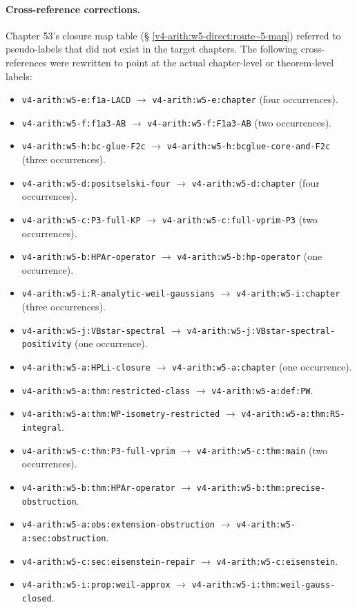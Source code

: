 \paragraph{Cross-reference corrections.}
Chapter 53's closure map table (\S
\ref{v4-arith:w5-direct:route~5-map}) referred to pseudo-labels that
did not exist in the target chapters. The following cross-references
were rewritten to point at the actual chapter-level or theorem-level
labels:
\begin{itemize}
\item \texttt{v4-arith:w5-e:f1a-LACD} \(\to\) \texttt{v4-arith:w5-e:chapter}
(four occurrences).
\item \texttt{v4-arith:w5-f:f1a3-AB} \(\to\) \texttt{v4-arith:w5-f:F1a3-AB}
(two occurrences).
\item \texttt{v4-arith:w5-h:bc-glue-F2c} \(\to\)
\texttt{v4-arith:w5-h:bcglue-core-and-F2c} (three occurrences).
\item \texttt{v4-arith:w5-d:positselski-four} \(\to\)
\texttt{v4-arith:w5-d:chapter} (four occurrences).
\item \texttt{v4-arith:w5-c:P3-full-KP} \(\to\)
\texttt{v4-arith:w5-c:full-vprim-P3} (two occurrences).
\item \texttt{v4-arith:w5-b:HPAr-operator} \(\to\)
\texttt{v4-arith:w5-b:hp-operator} (one occurrence).
\item \texttt{v4-arith:w5-i:R-analytic-weil-gaussians} \(\to\)
\texttt{v4-arith:w5-i:chapter} (three occurrences).
\item \texttt{v4-arith:w5-j:VBstar-spectral} \(\to\)
\texttt{v4-arith:w5-j:VBstar-spectral-positivity} (one occurrence).
\item \texttt{v4-arith:w5-a:HPLi-closure} \(\to\)
\texttt{v4-arith:w5-a:chapter} (one occurrence).
\item \texttt{v4-arith:w5-a:thm:restricted-class} \(\to\)
\texttt{v4-arith:w5-a:def:PW}.
\item \texttt{v4-arith:w5-a:thm:WP-isometry-restricted} \(\to\)
\texttt{v4-arith:w5-a:thm:RS-integral}.
\item \texttt{v4-arith:w5-c:thm:P3-full-vprim} \(\to\)
\texttt{v4-arith:w5-c:thm:main} (two occurrences).
\item \texttt{v4-arith:w5-b:thm:HPAr-operator} \(\to\)
\texttt{v4-arith:w5-b:thm:precise-obstruction}.
\item \texttt{v4-arith:w5-a:obs:extension-obstruction} \(\to\)
\texttt{v4-arith:w5-a:sec:obstruction}.
\item \texttt{v4-arith:w5-c:sec:eisenstein-repair} \(\to\)
\texttt{v4-arith:w5-c:eisenstein}.
\item \texttt{v4-arith:w5-i:prop:weil-approx} \(\to\)
\texttt{v4-arith:w5-i:thm:weil-gauss-closed}.
\end{itemize}

